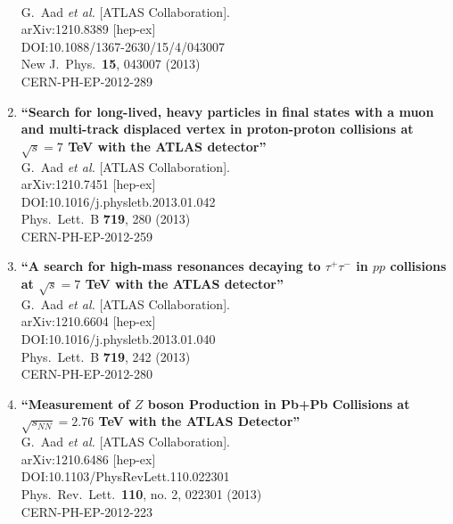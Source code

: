 \documentclass{article}
\begin{document}
\begin{enumerate}
  \\{}G.~Aad {\it et al.} [ATLAS Collaboration].
  \\{}arXiv:1210.8389 [hep-ex]
  \\{}DOI:10.1088/1367-2630/15/4/043007
  \\{}New J.\ Phys.\  {\bf 15}, 043007 (2013)
  \\{}CERN-PH-EP-2012-289
\item%
{\bf ``Search for long-lived, heavy particles in final states with a muon and multi-track displaced vertex in proton-proton collisions at $\sqrt{s}=7$ TeV with the ATLAS detector''}
  \\{}G.~Aad {\it et al.} [ATLAS Collaboration].
  \\{}arXiv:1210.7451 [hep-ex]
  \\{}DOI:10.1016/j.physletb.2013.01.042
  \\{}Phys.\ Lett.\ B {\bf 719}, 280 (2013)
  \\{}CERN-PH-EP-2012-259
\item%
{\bf ``A search for high-mass resonances decaying to $\tau^+\tau^-$ in $pp$ collisions at $\sqrt{s}=7$ TeV with the ATLAS detector''}
  \\{}G.~Aad {\it et al.} [ATLAS Collaboration].
  \\{}arXiv:1210.6604 [hep-ex]
  \\{}DOI:10.1016/j.physletb.2013.01.040
  \\{}Phys.\ Lett.\ B {\bf 719}, 242 (2013)
  \\{}CERN-PH-EP-2012-280
\item%
{\bf ``Measurement of $Z$ boson Production in Pb+Pb Collisions at $\sqrt{s_{NN}}=2.76$ TeV with the ATLAS Detector''}
  \\{}G.~Aad {\it et al.} [ATLAS Collaboration].
  \\{}arXiv:1210.6486 [hep-ex]
  \\{}DOI:10.1103/PhysRevLett.110.022301
  \\{}Phys.\ Rev.\ Lett.\  {\bf 110}, no. 2, 022301 (2013)
  \\{}CERN-PH-EP-2012-223

\end{enumerate}
\end{document}

